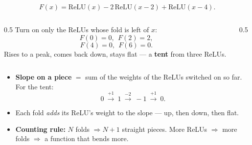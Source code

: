 \documentclass[aspectratio=169, 11pt]{beamer}
\newcommand{\relu}{\mathrm{ReLU}}
\begin{document}
\begin{frame}[t, plain]
  \[ F(x)=\relu(x)-2\,\relu(x-2)+\relu(x-4). \]
  \begin{columns}[T]
    \begin{column}{0.5\textwidth}
      Turn on only the ReLUs whose fold is left of $x$:
      \[ F(0)=0,\ \ F(2)=2, \]
      \[ F(4)=0,\ \ F(6)=0. \]
      Rises to a peak, comes back down, stays flat --- a \textbf{tent} from three ReLUs.
    \end{column}
    \begin{column}{0.5\textwidth}
      \centering
    \end{column}
  \end{columns}
\end{frame}

\begin{frame}[t, plain]
  \begin{itemize}
    \setlength{\itemsep}{6pt}
    \item \textbf{Slope on a piece} $=$ sum of the weights of the ReLUs switched on so far. For the tent:
          \[ 0 \ \xrightarrow{+1}\ 1 \ \xrightarrow{-2}\ -1 \ \xrightarrow{+1}\ 0. \]
    \item Each fold \emph{adds} its ReLU's weight to the slope --- up, then down, then flat.
    \item \textbf{Counting rule:} $N$ folds $\Rightarrow N+1$ straight pieces. More ReLUs $\Rightarrow$ more
          folds $\Rightarrow$ a function that bends more.
  \end{itemize}
\end{frame}
\end{document}
